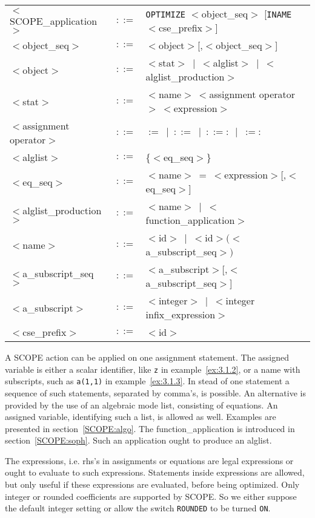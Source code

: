 \begin{center}
\begin{tabular}{lcl}
 $<$SCOPE\_application$>$ & $::=$ & {\tt OPTIMIZE} $<$object\_seq$>$
 [{\tt INAME} $<$cse\_prefix$>$]\\
 $<$object\_seq$>$ & $::=$ & $<$object$>$[,$<$object\_seq$>$]\\
 $<$object$>$ & $::=$ & $<$stat$>~\mid~<$alglist$>~\mid~<$alglist\_production$>$ \\
 $<$stat$>$ & $::=$ & $<$name$>~<$assignment operator$>~<$expression$>$\\
 $<$assignment operator$>$ & $::=$ & $:=~\mid~::=~\mid~::=:~\mid~:=:$\\
 $<$alglist$>$ & $::=$ & \{$<$eq\_seq$>$\}\\
 $<$eq\_seq$>$ & $::=$ & $<$name$>~=~<$expression$>$[,$<$eq\_seq$>$]\\
 $<$alglist\_production$>$ & $::=$ & $<$name$>~\mid~<$function\_application$>$\\
 $<$name$>$ & $::=$ & $<$id$>~\mid~<$id$>(<$a\_subscript\_seq$>)$\\
 $<$a\_subscript\_seq$>$ & $::=$ & $<$a\_subscript$>$[,$<$a\_subscript\_seq$>$]\\
 $<$a\_subscript$>$ & $::=$ & $<$integer$>~\mid~<$integer infix\_expression$>$\\
 $<$cse\_prefix$>$ & $::=$ & $<$id$>$
\end{tabular}
\end{center}

A SCOPE action can be applied on one assignment statement.
The assigned variable
is either a scalar identifier, like {\tt z} in example~\ref{ex:3.1.2}, or a
name with subscripts, such as {\tt a(1,1)} in example~\ref{ex:3.1.3}.
In stead of one
statement a sequence of such statements, separated by comma's, is possible.
An alternative is provided by the use of an algebraic mode list, consisting
of {\REDUCE} equations. An assigned variable, identifying such a list, is
allowed as well. Examples are presented in section~\ref{SCOPE:algo}.
The function\_application is introduced in section~\ref{SCOPE:soph}. Such an
application ought to produce an alglist.

The expressions, i.e. rhs's in assignments or equations are legal {\REDUCE}
expressions or ought to evaluate to such expressions. Statements inside
expressions are allowed, but only useful if these expressions are evaluated,
before being optimized. Only integer or rounded coefficients are supported
by SCOPE. So we either suppose the default integer setting or allow the switch
{\tt ROUNDED} to be turned {\tt ON}.

